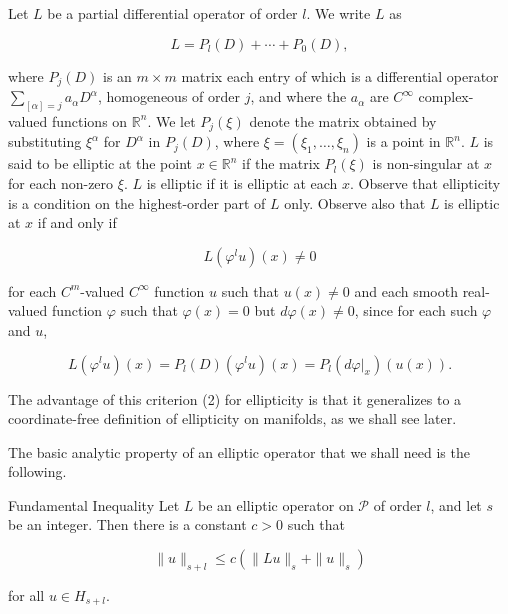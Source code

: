 \begin{definition}\label{thm:6.28}
Let $L$ be a partial differential operator of order $l$. We write $L$ as 

\begin{equation}
\tag{1}\label{eq:6.28:1}
L=P_{l}(D)+\cdots+P_{0}(D),
\end{equation}

where $P_{j}(D)$ is an $m \times m$ matrix each entry of which is a differential operator $\sum_{[\alpha]=j}a_{\alpha}D^{\alpha}$, homogeneous of order $j$, and where the $a_{\alpha}$ are $C^{\infty}$ complex-valued functions on  $ \mathbb{R}^n $. We let  $ P_j(\xi) $ denote the matrix obtained by substituting  $ \xi^{\alpha} $ for  $ D^{\alpha} $ in  $ P_j(D) $, where  $ \xi = (\xi_1, \ldots, \xi_n) $ is a point in  $ \mathbb{R}^n $. $L$ is said to be elliptic at the point  $ x \in \mathbb{R}^n $ if the matrix  $ P_{l}(\xi) $ is non-singular at $x$ for each non-zero  $ \xi $. $L$ is elliptic if it is elliptic at each $x$. Observe that ellipticity is a condition on the highest-order part of $L$ only. Observe also that $L$ is elliptic at $x$ if and only if

\begin{equation}
\tag{2}\label{eq:6.28:2}
L(\varphi^{l}u)(x)\neq0
\end{equation}

for each $C^{m}$-valued $C^{\infty}$ function $u$ such that $u(x) \neq 0$ and each smooth real-valued function $\varphi$ such that $\varphi(x) = 0$ but $d\varphi(x) \neq 0$, since for each such $\varphi$ and $u$,

\begin{equation}
\tag{3}\label{eq:6.28:3}
L(\varphi^{l}u)(x)=P_{l}(D)(\varphi^{l}u)(x)=P_{l}(d\varphi|_{x})(u(x)).
\end{equation}

The advantage of this criterion (2) for ellipticity is that it generalizes to a coordinate-free definition of ellipticity on manifolds, as we shall see later.

\end{definition}

The basic analytic property of an elliptic operator that we shall need is the following.

\begin{theorem}{Fundamental Inequality}\label{thm:6.29}
Let $L$ be an elliptic operator on  $ \mathcal{P} $ of order $l$, and let $s$ be an integer. Then there is a constant $c>0$ such that 

\begin{equation}
\tag{1}\label{eq:6.29:1}
\|u\|_{s+l}\leq c(\|L u\|_{s}+\|u\|_{s})
\end{equation}

for all $u \in H_{s+l}$.

\end{theorem}

